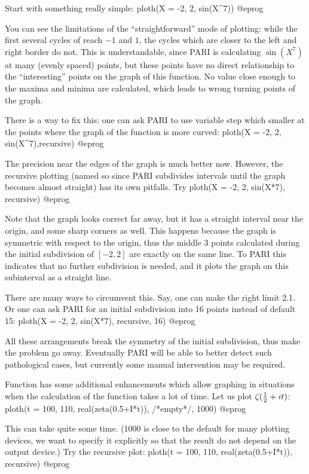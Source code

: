 Start with something really simple:
\bprog
ploth(X = -2, 2, sin(X^7))
@eprog

You can see the limitations of the ``straightforward'' mode of plotting:
while the first several cycles of  reach $-1$ and $1$, the cycles
which are closer to the left and right border do not. This is understandable,
since PARI is calculating $\sin(X^7)$ at many (evenly spaced) points, but
these points have no direct relationship to the ``interesting'' points on
the graph of this function.  No value close enough to the maxima and minima
are calculated, which leads to wrong turning points of the graph.

There is a way to fix this: one can ask PARI to use variable step which
smaller at the points where the graph of the function is more curved:
\bprog
  ploth(X = -2, 2, sin(X^7),recursive)
@eprog

\noindent The precision near the edges of the graph is much better now.
However, the recursive plotting (named so since PARI subdivides intervals
until the graph becomes almost straight) has its own pitfalls.  Try
\bprog
  ploth(X = -2, 2, sin(X*7), recursive)
@eprog

\noindent Note that the graph looks correct far away, but it has a straight
interval near the origin, and some sharp corners as well.  This happens
because the graph is symmetric with respect to the origin, thus the middle 3
points calculated during the initial subdivision of $[-2,2]$ are exactly on
the same line.  To PARI this indicates that no further subdivision is needed,
and it plots the graph on this subinterval as a straight line.

There are many ways to circumvent this.  Say, one can make the right limit
2.1.  Or one can ask PARI for an initial subdivision into 16 points instead
of default 15:
\bprog
  ploth(X = -2, 2, sin(X*7), recursive, 16)
@eprog

All these arrangements break the symmetry of the initial subdivision, thus
make the problem go away.  Eventually PARI will be able to better detect such
pathological cases, but currently some manual intervention may be required.

Function  has some additional enhancements which allow graphing
in situations when the calculation of the function takes a lot of time.  Let
us plot $\zeta({1\over 2} + it)$:
\bprog
  ploth(t = 100, 110, real(zeta(0.5+I*t)), /*empty*/, 1000)
@eprog

\noindent This can take quite some time.  (1000 is close to the default for
many plotting devices, we want to specify it explicitly so that the result
do not depend on the output device.)  Try the recursive plot:
\bprog
  ploth(t = 100, 110, real(zeta(0.5+I*t)), recursive)
@eprog

